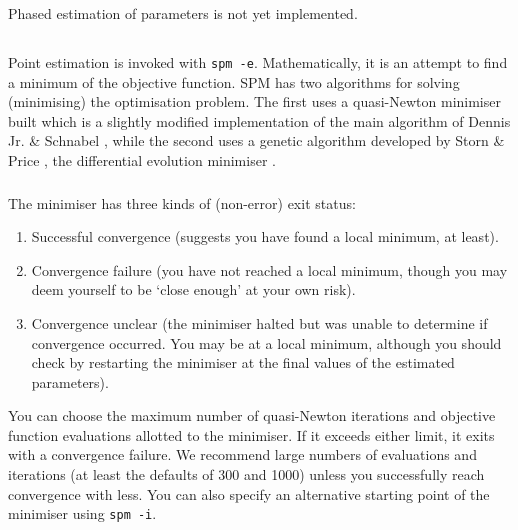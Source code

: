 Phased estimation of parameters is not yet implemented.

\subsection{\label{sec:estimate-MPD}}

Point estimation is invoked with \texttt{spm -e}. Mathematically, it is an attempt to find a minimum of the objective function. SPM has two algorithms for solving (minimising) the optimisation problem. The first uses a quasi-Newton minimiser built which is a slightly modified implementation of the main algorithm of Dennis Jr. \& Schnabel \citep{779}, while the second uses a genetic algorithm developed by Storn \& Price \citep{1442}, the differential evolution minimiser .

\subsubsection{}

The minimiser has three kinds of (non-error) exit status: 

\begin{enumerate}
\item Successful convergence (suggests you have found a local minimum, at least).
\item Convergence failure (you have not reached a local minimum, though you may deem yourself to be `close enough' at your own risk).
\item Convergence unclear (the minimiser halted but was unable to determine if convergence occurred. You may be at a local minimum, although you should check by restarting the minimiser at the final values of the estimated parameters).
\end{enumerate}

You can choose the maximum number of quasi-Newton iterations and objective function evaluations allotted to the minimiser. If it exceeds either limit, it exits with a convergence failure. We recommend large numbers of evaluations and iterations (at least the defaults of 300 and 1000) unless you successfully reach convergence with less. You can also specify an alternative starting point of the minimiser using \texttt{spm -i}.

